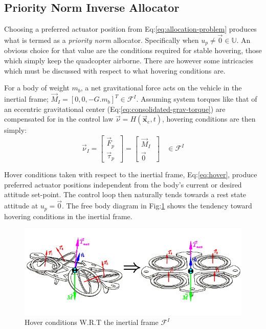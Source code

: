 \subsection{Priority Norm Inverse Allocator}
\label{subsec:allocation.allocators.norminverse}
Choosing a preferred actuator position from Eq:\ref{eq:allocation-problem} produces what is termed as a \emph{priority norm} allocator. Specifically when $u_p\not=\vec{0}\in\mathbb{U}$. An obvious choice for that value are the conditions required for stable hovering, those which simply keep the quadcopter airborne. There are however some intricacies which must be discussed with respect to what hovering conditions are.
\par
For a body of weight $m_b$, a net gravitational force acts on the vehicle in the inertial frame; $\vec{M}_I=[0, 0, -G.m_b]^T\in\mathcal{F}^I$. Assuming system torques like that of an eccentric gravitational center (Eq:\ref{eq:consolidated-grav-torque}) are compensated for in the control law $\vec{\nu}=H(\vec{\mathbf{x}}_e,t)$, hovering conditions are then simply:
\begin{equation}\label{eq:hover}
\vec{\nu}_I=
\begin{bmatrix}
\vec{F}_p\hspace{3pt}\\
\vec{\tau}_p\hspace{3pt}
\end{bmatrix}
=
\begin{bmatrix}
\vec{M}_I\hspace{3pt}\\
\vec{0}\hspace{3pt}
\end{bmatrix}~~~~\in\mathcal{F}^I
\end{equation}
\par
Hover conditions taken with respect to the inertial frame, Eq:\ref{eq:hover}, produce preferred actuator positions independent from the body's current or desired attitude set-point. The control loop then naturally tends towards a rest state attitude at $u_p=\vec{0}$. The free body diagram in Fig:\ref{fig:hover-inertial} shows the tendency toward hovering conditions in the inertial frame.
\begin{figure}[htbp]
\centering
\includegraphics[width=\textwidth]{figs/hover-inertial}
\caption{Hover conditions W.R.T the inertial frame $\mathcal{F}^I$}
\label{fig:hover-inertial}
\end{figure}
